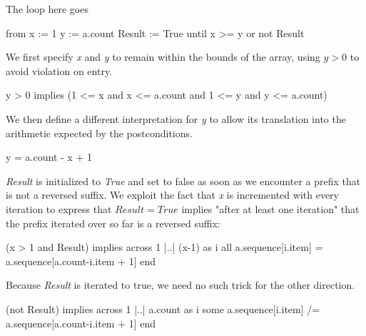 The loop here goes
\begin{eSimple}
from
	x := 1
	y := a.count
	Result := True
until
	x >= y or not Result
\end{eSimple}
We first specify \emph{x} and \emph{y} to remain within the bounds of the array, using $y > 0$ to avoid violation on entry.
\begin{eSimple}
y > 0 implies (1 <= x and x <= a.count and 1 <= y and y <= a.count)
\end{eSimple}

We then define a different interpretation for \emph{y} to allow its translation into the arithmetic expected by the postconditions.
\begin{eSimple}
y = a.count - x + 1
\end{eSimple}

\emph{Result} is initialized to \emph{True} and set to false as soon as we encounter a prefix that is not a reversed suffix. We exploit the fact that \emph{x} is incremented with every iteration to express that $Result = True$ implies "after at least one iteration" that the prefix iterated over so far is a reversed suffix:
\begin{eSimple}
(x > 1 and Result) implies across 1 |..| (x-1) as i all a.sequence[i.item] = a.sequence[a.count-i.item + 1] end
\end{eSimple}
Because \emph{Result} is iterated to true, we need no such trick for the other direction.
\begin{eSimple}
(not Result) implies across 1 |..| a.count as i some a.sequence[i.item] /= a.sequence[a.count-i.item + 1] end
\end{eSimple}
